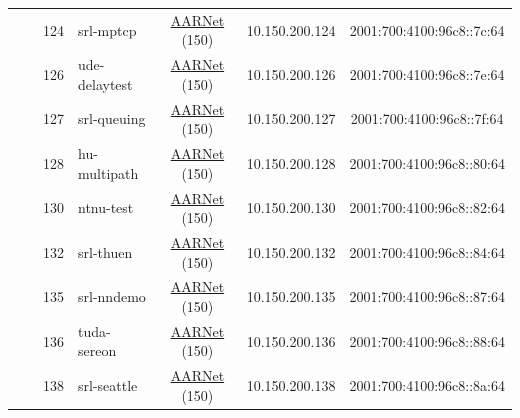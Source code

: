\begin{small}
\begin{center}
\begin{longtable}{|c|c|c|c|c|c|c|c|}
  &  & \tiny{124} & \multicolumn{1}{|l|}{\tiny{srl-mptcp}} & \multicolumn{2}{|c|}{\tiny{\href{https://www.aarnet.edu.au/}{AARNet} (150)}} & \tiny{10.150.200.124} & \tiny{2001:700:4100:96c8::7c:64} \\* \cline{3-3}\cline{4-4}\cline{5-5}\cline{6-6}\cline{7-7}\cline{8-8}
  &  & \tiny{126} & \multicolumn{1}{|l|}{\tiny{ude-delaytest}} & \multicolumn{2}{|c|}{\tiny{\href{https://www.aarnet.edu.au/}{AARNet} (150)}} & \tiny{10.150.200.126} & \tiny{2001:700:4100:96c8::7e:64} \\* \cline{3-3}\cline{4-4}\cline{5-5}\cline{6-6}\cline{7-7}\cline{8-8}
  &  & \tiny{127} & \multicolumn{1}{|l|}{\tiny{srl-queuing}} & \multicolumn{2}{|c|}{\tiny{\href{https://www.aarnet.edu.au/}{AARNet} (150)}} & \tiny{10.150.200.127} & \tiny{2001:700:4100:96c8::7f:64} \\* \cline{3-3}\cline{4-4}\cline{5-5}\cline{6-6}\cline{7-7}\cline{8-8}
  &  & \tiny{128} & \multicolumn{1}{|l|}{\tiny{hu-multipath}} & \multicolumn{2}{|c|}{\tiny{\href{https://www.aarnet.edu.au/}{AARNet} (150)}} & \tiny{10.150.200.128} & \tiny{2001:700:4100:96c8::80:64} \\* \cline{3-3}\cline{4-4}\cline{5-5}\cline{6-6}\cline{7-7}\cline{8-8}
  &  & \tiny{130} & \multicolumn{1}{|l|}{\tiny{ntnu-test}} & \multicolumn{2}{|c|}{\tiny{\href{https://www.aarnet.edu.au/}{AARNet} (150)}} & \tiny{10.150.200.130} & \tiny{2001:700:4100:96c8::82:64} \\* \cline{3-3}\cline{4-4}\cline{5-5}\cline{6-6}\cline{7-7}\cline{8-8}
  &  & \tiny{132} & \multicolumn{1}{|l|}{\tiny{srl-thuen}} & \multicolumn{2}{|c|}{\tiny{\href{https://www.aarnet.edu.au/}{AARNet} (150)}} & \tiny{10.150.200.132} & \tiny{2001:700:4100:96c8::84:64} \\* \cline{3-3}\cline{4-4}\cline{5-5}\cline{6-6}\cline{7-7}\cline{8-8}
  &  & \tiny{135} & \multicolumn{1}{|l|}{\tiny{srl-nndemo}} & \multicolumn{2}{|c|}{\tiny{\href{https://www.aarnet.edu.au/}{AARNet} (150)}} & \tiny{10.150.200.135} & \tiny{2001:700:4100:96c8::87:64} \\* \cline{3-3}\cline{4-4}\cline{5-5}\cline{6-6}\cline{7-7}\cline{8-8}
  &  & \tiny{136} & \multicolumn{1}{|l|}{\tiny{tuda-sereon}} & \multicolumn{2}{|c|}{\tiny{\href{https://www.aarnet.edu.au/}{AARNet} (150)}} & \tiny{10.150.200.136} & \tiny{2001:700:4100:96c8::88:64} \\* \cline{3-3}\cline{4-4}\cline{5-5}\cline{6-6}\cline{7-7}\cline{8-8}
  &  & \tiny{138} & \multicolumn{1}{|l|}{\tiny{srl-seattle}} & \multicolumn{2}{|c|}{\tiny{\href{https://www.aarnet.edu.au/}{AARNet} (150)}} & \tiny{10.150.200.138} & \tiny{2001:700:4100:96c8::8a:64} \\* \cline{3-3}\cline{4-4}\cline{5-5}\cline{6-6}\cline{7-7}\cline{8-8}

\end{longtable}
\end{center}
\end{small}
